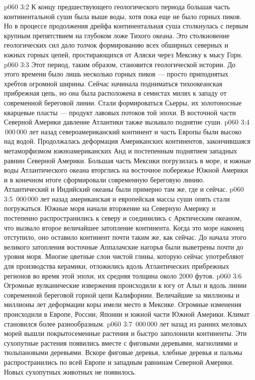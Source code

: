 \vs p060 3:2 К концу предшествующего геологического периода большая часть континентальной суши была выше воды, хотя пока еще не было горных пиков. Но в процессе продолжения дрейфа континентальная суша столкнулась с первым крупным препятствием на глубоком ложе Тихого океана. Это столкновение геологических сил дало толчок формированию всех обширных северных и южных горных цепей, простирающихся от Аляски через Мексику к мысу Горн.
\vs p060 3:3 Этот период, таким образом, становится  геологической истории. До этого времени было лишь несколько горных пиков --- просто приподнятых хребтов огромной ширины. Сейчас начинала подниматься тихоокеанская прибрежная цепь, но она была расположена в семистах милях к западу от современной береговой линии. Стали формироваться Сьерры, их золотоносные кварцевые пласты --- продукт лавовых потоков той эпохи. В восточной части Северной Америки давление Атлантики также вызывало поднятие суши.
\vs p060 3:4 \,000\,000 лет назад североамериканский континент и часть Европы были высоко над водой. Продолжалась деформация Американских континентов, закончившаяся метаморфизмом южноамериканских Анд и постепенным поднятием западных равнин Северной Америки. Большая часть Мексики погрузилась в море, и южные воды Атлантического океана вторглись на восточное побережье Южной Америки и в конечном итоге сформировали современную береговую линию. Атлантический и Индийский океаны были примерно там же, где и сейчас.
\vs p060 3:5 \,000\,000 лет назад американская и европейская массы суши опять стали погружаться. Южные моря начали вторжение на Северную Америку и постепенно распространились к северу и соединились с Арктическим океаном, что вызвало второе величайшее затопление континента. Когда это море наконец отступило, оно оставило континент почти таким же, как сейчас. До начала этого великого затопления восточные Аппалачские нагорья были выветрены почти до уровня моря. Многие цветные слои чистой глины, которую сейчас употребляют для производства керамики, отложились вдоль Атлантических прибрежных регионов во время этой эпохи, их средняя толщина около 2000 футов.
\vs p060 3:6 Огромные вулканические извержения происходили к югу от Альп и вдоль линии современной береговой горной цепи Калифорнии. Величайшие за миллионы и миллионы лет деформации коры имели место в Мексике. Огромные изменения происходили в Европе, России, Японии и южной части Южной Америки. Климат становился более разнообразным.
\vs p060 3:7 \,000\,000 лет назад из ранних меловых морей вышли покрытосеменные растения и быстро заполонили континенты. Эти сухопутные растения  появились вместе с фиговыми деревьями, магнолиями и тюльпановыми деревьями. Вскоре фиговые деревья, хлебные деревья и пальмы распространились по всей Европе и западным равнинам Северной Америки. Новых сухопутных животных не появилось.
